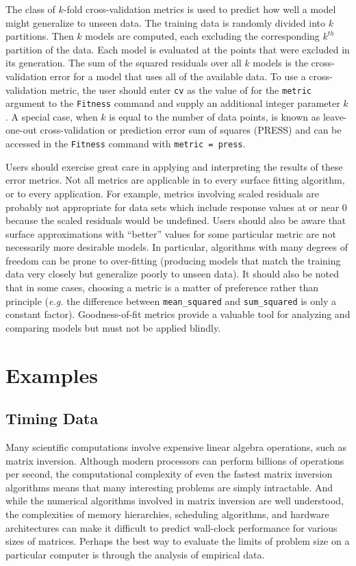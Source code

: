 \documentclass{article}
\begin{document}
The class of $k$-fold cross-validation metrics is used to predict how well a model might generalize to unseen data.  The training data is randomly divided into $k$ partitions.  Then $k$ models are computed, each excluding the corresponding $k^{th}$ partition of the data.  Each model is evaluated at the points that were excluded in its generation.  The sum of the squared residuals over all $k$ models is the cross-validation error for a model that uses all of the available data.  To use a cross-validation metric, the user should enter \texttt{cv} as the value of for the \texttt{metric} argument to the \texttt{Fitness} command and supply an additional integer parameter $k$.  A special case, when $k$ is equal to the number of data points, is known as leave-one-out cross-validation or prediction error sum of squares (PRESS) and can be accessed in the \texttt{Fitness} command with \texttt{metric = press}.

Users should exercise great care in applying and interpreting the results of these error metrics.  Not all metrics are applicable in to every surface fitting algorithm, or to every application.  For example, metrics involving scaled residuals are probably not appropriate for data sets which include response values at or near 0 because the scaled residuals would be undefined.  Users should also be aware that surface approximations with ``better'' values for some particular metric are not necessarily more desirable models.  In particular, algorithms with many degrees of freedom can be prone to over-fitting (producing models that match the training data very closely but generalize poorly to unseen data).  It should also be noted that in some cases, choosing a metric is a matter of preference rather than principle ({\em e.g.} the difference between \texttt{mean\_squared} and \texttt{sum\_squared} is only a constant factor).  Goodness-of-fit metrics provide a valuable tool for analyzing and comparing models but must not be applied blindly.


\pagebreak
\section{Examples}
\subsection{Timing Data}
Many scientific computations involve expensive linear algebra operations, such
as matrix inversion.  Although modern processors can perform billions of
operations per second, the computational complexity of even the fastest matrix inversion
algorithms means that many interesting problems are simply intractable.  And while the
numerical algorithms involved in matrix inversion are well understood, the
complexities of memory hierarchies, scheduling algorithms, and hardware
architectures can make it difficult to predict wall-clock performance for
various sizes of matrices.  Perhaps the best way to evaluate the limits of
problem size on a particular computer is through the analysis of empirical data.
\end{document}
